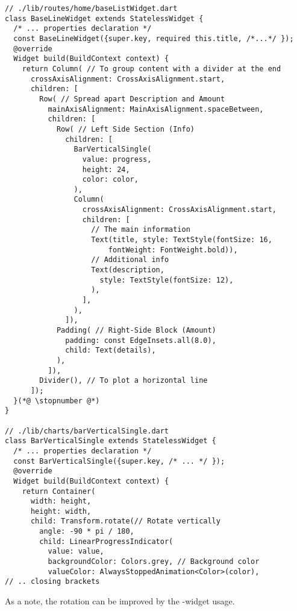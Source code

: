 \begin{lstlisting}
// ./lib/routes/home/baseListWidget.dart
class BaseLineWidget extends StatelessWidget {
  /* ... properties declaration */
  const BaseLineWidget({super.key, required this.title, /*...*/ });
  @override
  Widget build(BuildContext context) {
    return Column( // To group content with a divider at the end
      crossAxisAlignment: CrossAxisAlignment.start,
      children: [
        Row( // Spread apart Description and Amount
          mainAxisAlignment: MainAxisAlignment.spaceBetween,
          children: [
            Row( // Left Side Section (Info)
              children: [
                BarVerticalSingle(
                  value: progress, 
                  height: 24, 
                  color: color,
                ),
                Column(
                  crossAxisAlignment: CrossAxisAlignment.start,
                  children: [
                    // The main information
                    Text(title, style: TextStyle(fontSize: 16, 
                        fontWeight: FontWeight.bold)),
                    // Additional info
                    Text(description,
                      style: TextStyle(fontSize: 12),
                    ),
                  ],
                ),
              ]),
            Padding( // Right-Side Block (Amount)
              padding: const EdgeInsets.all(8.0),
              child: Text(details),
            ),
          ]),
        Divider(), // To plot a horizontal line
      ]);
  }(*@ \stopnumber @*)
}

// ./lib/charts/barVerticalSingle.dart
class BarVerticalSingle extends StatelessWidget {
  /* ... properties declaration */
  const BarVerticalSingle({super.key, /* ... */ });
  @override
  Widget build(BuildContext context) {
    return Container(
      width: height,
      height: width,
      child: Transform.rotate(// Rotate vertically
        angle: -90 * pi / 180,
        child: LinearProgressIndicator(
          value: value,
          backgroundColor: Colors.grey, // Background color
          valueColor: AlwaysStoppedAnimation<Color>(color),
// .. closing brackets
\end{lstlisting}

\noindent As a note, the rotation can be improved by the -widget usage.


